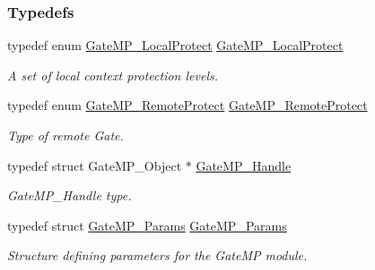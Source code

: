\subsubsection*{Typedefs}
\begin{DoxyCompactItemize}
\item 
typedef enum \hyperlink{_gate_m_p_8h_a3877bd64627d7449d3687e8b06939652}{Gate\-M\-P\-\_\-\-Local\-Protect} \hyperlink{_gate_m_p_8h_accb7b6c936aebe10e31d909310398fe5}{Gate\-M\-P\-\_\-\-Local\-Protect}
\begin{DoxyCompactList}\small\item\em A set of local context protection levels. \end{DoxyCompactList}\item 
typedef enum \hyperlink{_gate_m_p_8h_a88716d5706d8fa8c6a3b9a4f023ef1d8}{Gate\-M\-P\-\_\-\-Remote\-Protect} \hyperlink{_gate_m_p_8h_a1400ba94db5b5fefd196649a9c9a4c63}{Gate\-M\-P\-\_\-\-Remote\-Protect}
\begin{DoxyCompactList}\small\item\em Type of remote Gate. \end{DoxyCompactList}\item 
typedef struct Gate\-M\-P\-\_\-\-Object $\ast$ \hyperlink{_gate_m_p_8h_ad5bb259f928a14e98d973334bc60ebb3}{Gate\-M\-P\-\_\-\-Handle}
\begin{DoxyCompactList}\small\item\em Gate\-M\-P\-\_\-\-Handle type. \end{DoxyCompactList}\item 
typedef struct \hyperlink{struct_gate_m_p___params}{Gate\-M\-P\-\_\-\-Params} \hyperlink{_gate_m_p_8h_aa87249c5e69b88bfaa4ee817cacd3b42}{Gate\-M\-P\-\_\-\-Params}
\begin{DoxyCompactList}\small\item\em Structure defining parameters for the Gate\-M\-P module. \end{DoxyCompactList}\end{DoxyCompactItemize}
